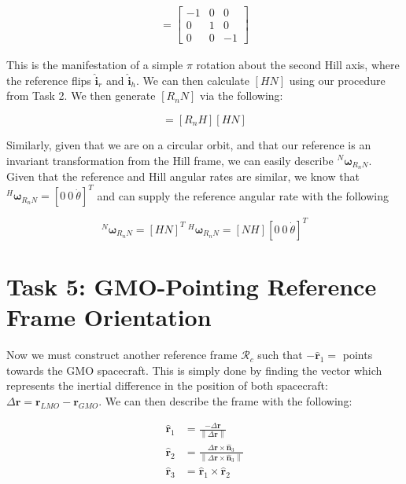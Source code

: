 \documentclass[paper]{aiaaNew}
\newcommand{\norm}[1]{\left\lVert#1\right\rVert}
\begin{document}
\begin{align}
  [R_nH] =  
  \begin{bmatrix}
  -1 & 0 & 0 \\
  0 & 1 & 0 \\
  0 & 0 & -1
  \end{bmatrix}
\end{align}

This is the manifestation of a simple $\pi$ rotation about the second Hill axis, where the reference flips $\hat{\bm{i}}_r$ and $\hat{\bm{i}}_h$. We can then calculate $[HN]$ using our procedure from Task 2. We then generate $[R_nN]$ via the following:

\begin{equation}
  [R_nN] = [R_nH][HN]
\end{equation}

Similarly, given that we are on a circular orbit, and that our reference is an invariant transformation from the Hill frame, we can easily describe $^N \bm{\omega}_{R_nN}$. Given that the reference and Hill angular rates are similar, we know that $^H \bm{\omega}_{R_nN} = [0 \ 0 \ \dot{\theta}]^T$ and can supply the reference angular rate with the following


\begin{equation}
  ^N \bm{\omega}_{R_nN} = [HN]^T \ ^H \bm{\omega}_{R_nN} = [NH][0 \ 0 \ \dot{\theta}]^T
\end{equation}







\section*{Task 5: GMO-Pointing Reference Frame Orientation}
Now we must construct another reference frame $\mathcal{R}_c$ such that $-\hat{\bm{r}}_1 = $ points towards the GMO spacecraft. This is simply done by finding the vector which represents the inertial difference in the position of both spacecraft: $\Delta\bm{r} = \bm{r}_{LMO} - \bm{r}_{GMO}$. We can then describe the frame with the following:

\begin{align}
  \hat{\bm{r}}_1 &= \frac{-\Delta\bm{r}}{\norm{\Delta\bm{r}}} \\ 
  \hat{\bm{r}}_2 &= \frac{\Delta\bm{r} \times \hat{\bm{n}}_3}{\norm{\Delta\bm{r} \times \hat{\bm{n}}_3}} \\ 
  \hat{\bm{r}}_3 &= \hat{\bm{r}}_1 \times \hat{\bm{r}}_2 
\end{align}
\end{document}
